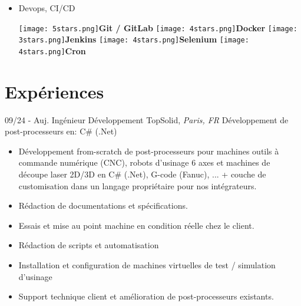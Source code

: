 \documentclass[]{friggeri-cv}
\begin{document}
\begin{flushleft}
\begin{multicols}{3}
\begin{itemize}
\item \large Devops, CI/CD \
\normalsize
\begin{flushleft}

\texttt{[image: 5stars.png]}\hspace{1.5mm}\textbf{Git / GitLab}
\texttt{[image: 4stars.png]}\hspace{1.5mm}\textbf{Docker}
\texttt{[image: 3stars.png]}\hspace{1.5mm}\textbf{Jenkins}
\texttt{[image: 4stars.png]}\hspace{1.5mm}\textbf{Selenium}
\texttt{[image: 4stars.png]}\hspace{1.5mm}\textbf{Cron}
\end{flushleft}            


        \end{itemize}
        \end{multicols}
        \end{flushleft} \normalsize
        \vspace*{-0.65cm}
\section{Expériences}
\vspace*{-0.25cm}

\begin{entrylist}
  \entry
    {09/24 - Auj.}
    {Ingénieur Développement}
    {TopSolid, \textit{Paris, FR}}
    {Développement de post-processeurs en:  C\# (.Net)}
\end{entrylist}
\vspace{-15pt}

\vspace{0.5mm}
\begin{itemize}
\setlength{\itemsep}{1pt}
\setlength{\parskip}{0pt}
\setlength{\parsep}{0pt}

\item Développement from-scratch de post-processeurs pour machines outils à commande numérique (CNC), robots d'usinage 6 axes et machines de découpe laser 2D/3D en C\# (.Net), G-code (Fanuc), ... + couche de customisation dans un langage propriétaire pour nos intégrateurs.
\item Rédaction de documentations et spécifications.
\item Essais et mise au point machine en condition réelle chez le client.
\item Rédaction de scripts et automatisation
\item Installation et configuration de machines virtuelles de test / simulation d'usinage
\item Support technique client et amélioration de post-processeurs existants.
\end{itemize}
\end{document}
